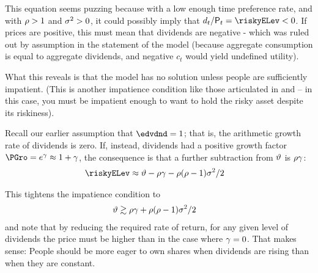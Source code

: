 \documentclass{\handout}
\begin{document}
  This equation seems puzzing because with a low enough time preference rate, and with $\rho > 1$ and $\sigma^{2} > 0$, it could possibly imply that $\dvdnd_{t}/\Price_{t} = \riskyELev < 0$.  If prices are positive, this must mean that dividends are negative - which was ruled out by assumption in the statement of the model (because aggregate consumption is equal to aggregate dividends, and negative $c_{t}$ would yield undefined utility).

  What this reveals is that the model has no solution unless people are sufficiently impatient.  (This is another impatience condition like those articulated in  and  -- in this case, you must be impatient enough to want to hold the risky asset despite its riskiness).
  
  Recall our earlier assumption that $\edvdnd=1$; that is, the arithmetic growth rate of dividends is zero.  If, instead, dividends had a positive growth factor $\PGro=e^{\pGro}\approx 1+\pGro$, the consequence is that a further subtraction from $\vartheta$ is $\rho \gamma$:
  \begin{equation}\begin{gathered}\begin{aligned}
      \riskyELev & \approx \timeRate - \CRRA \pGro -\CRRA (\CRRA-1)\riskyvar/2
      \end{aligned}\end{gathered}\end{equation}

  This tightens the impatience condition to
  \begin{equation}\begin{gathered}\begin{aligned}
        \vartheta & \gtrsim \rho \gamma + \rho (\rho-1)\sigma^{2}/2
      \end{aligned}\end{gathered}\end{equation}
and note that by reducing the required rate of return, for any given level of dividends the price must be higher than in the case where $\gamma=0$.  That makes sense: People should be more eager to own shares when dividends are rising than when they are constant.
\end{document}

